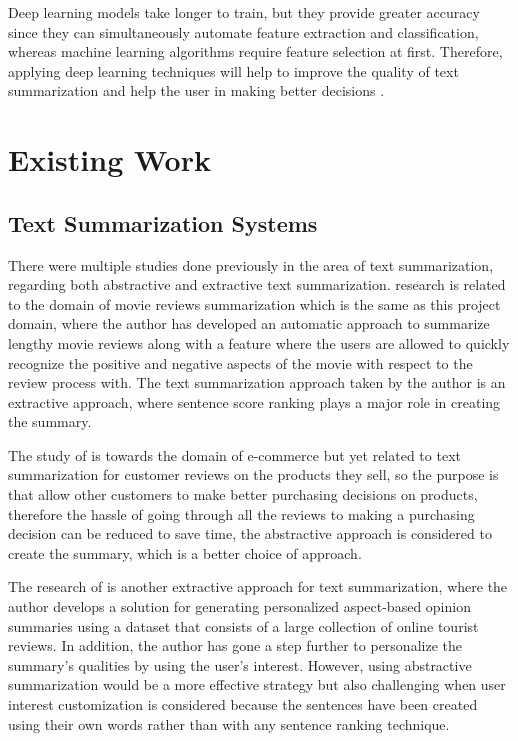 \documentclass[conference]{IEEEtran}
\begin{document}
Deep learning models take longer to train, but they provide greater accuracy since they can simultaneously automate feature extraction and classification, whereas machine learning algorithms require feature selection at first. Therefore, applying deep learning techniques will help to improve the quality of text summarization and help the user in making better decisions \cite{etemad_abidi_chhabra_2021}.

\section{Existing Work}

\subsection{Text Summarization Systems}

There were multiple studies done previously in the area of text summarization, regarding both abstractive and extractive text summarization. \cite{khan_gul_zareei_biswal_zeb_naeem_saeed_salim_2020} research is related to the domain of movie reviews summarization which is the same as this project domain, where the author has developed an automatic approach to summarize lengthy movie reviews along with a feature where the users are allowed to quickly recognize the positive and negative aspects of the movie with respect to the review process with. The text summarization approach taken by the author is an extractive approach, where sentence score ranking plays a major role in creating the summary.

The study of \cite{boorugu_ramesh_2020} is towards the domain of e-commerce but yet related to text summarization for customer reviews on the products they sell, so the purpose is that allow other customers to make better purchasing decisions on products, therefore the hassle of going through all the reviews to making a purchasing decision can be reduced to save time, the abstractive approach is considered to create the summary, which is a better choice of approach.

The research of \cite{mukherjee_peruri_vishnu_goyal_bhattacharya_ganguly_2020} is another extractive approach for text summarization, where the author develops a solution for generating personalized aspect-based opinion summaries using a  dataset that consists of a large collection of online tourist reviews. In addition, the author has gone a step further to personalize the summary's qualities by using the user's interest. However, using abstractive summarization would be a more effective strategy but also challenging when user interest customization is considered because the sentences have been created using their own words rather than with any sentence ranking technique.
\end{document}
